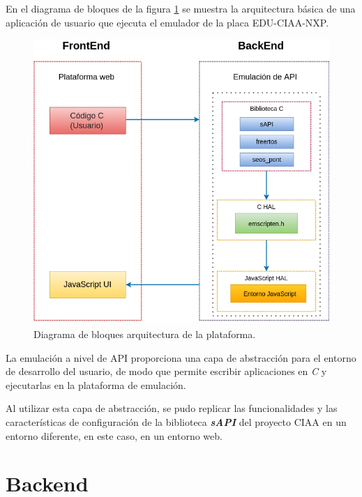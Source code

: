 En el diagrama de bloques de la figura \ref{fig:Arquitectura} se muestra la arquitectura básica de una aplicación de usuario que ejecuta el emulador de la placa EDU-CIAA-NXP.


\begin{figure}[ht]
	\centering
	\includegraphics[scale=.55]{./Figures/Arquitectura.png}
	\caption{Diagrama de bloques arquitectura de la plataforma.}
	\label{fig:Arquitectura}
\end{figure}


La emulación a nivel de API proporciona una capa de abstracción para el entorno de desarrollo del usuario, de modo que permite escribir aplicaciones en \textit{C} y ejecutarlas en la plataforma de emulación. 

Al utilizar esta capa de abstracción, se pudo replicar las funcionalidades y las características de configuración de la biblioteca \textit{\textbf{sAPI}} del proyecto CIAA en un entorno diferente, en este caso, en un entorno web.

\hfill \break
\hfill \break
\hfill \break
\hfill \break
\hfill \break
\hfill \break
\hfill \break
\hfill \break
\hfill \break
\hfill \break




\section{Backend}

